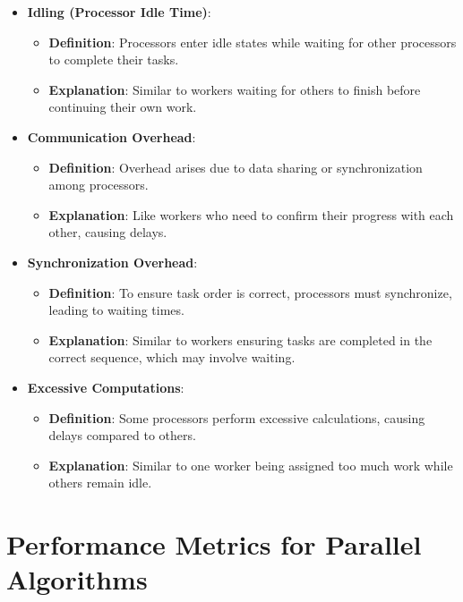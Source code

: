 \documentclass[12pt,a4paper]{article}
\begin{document}
\begin{itemize}
    \item \textbf{Idling (Processor Idle Time)}:
    \begin{itemize}
        \item \textbf{Definition}: Processors enter idle states while waiting for other processors to complete their tasks.
        \item \textbf{Explanation}: Similar to workers waiting for others to finish before continuing their own work.
    \end{itemize}

    \item \textbf{Communication Overhead}:
    \begin{itemize}
        \item \textbf{Definition}: Overhead arises due to data sharing or synchronization among processors.
        \item \textbf{Explanation}: Like workers who need to confirm their progress with each other, causing delays.
    \end{itemize}

    \item \textbf{Synchronization Overhead}:
    \begin{itemize}
        \item \textbf{Definition}: To ensure task order is correct, processors must synchronize, leading to waiting times.
        \item \textbf{Explanation}: Similar to workers ensuring tasks are completed in the correct sequence, which may involve waiting.
    \end{itemize}

    \item \textbf{Excessive Computations}:
    \begin{itemize}
        \item \textbf{Definition}: Some processors perform excessive calculations, causing delays compared to others.
        \item \textbf{Explanation}: Similar to one worker being assigned too much work while others remain idle.
    \end{itemize}
\end{itemize}

\section{Performance Metrics for Parallel Algorithms}
\end{document}
